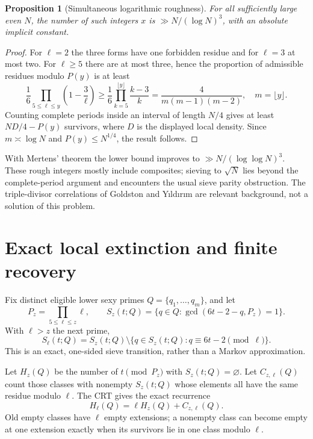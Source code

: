 \documentclass[11pt,a4paper]{article}
\newtheorem{proposition}[theorem]{Proposition}
\theoremstyle{definition}
\begin{document}
\begin{proposition}[Simultaneous logarithmic roughness]\label{prop:rough}
For all sufficiently large even $N$, the number of such integers $x$
is $\gg N/(\log N)^3$, with an absolute implicit constant.
\end{proposition}
\begin{proof}
For $\ell=2$ the three forms have one forbidden residue and for
$\ell=3$ at most two. For $\ell\ge5$ there are at most three, hence
the proportion of admissible residues modulo $P(y)$ is at least
\[
 \frac16\prod_{5\le\ell\le y}\left(1-\frac3\ell\right)
 \ge\frac16\prod_{k=5}^{\lfloor y\rfloor}\frac{k-3}{k}
 =\frac{4}{m(m-1)(m-2)},\quad m=\lfloor y\rfloor.
\]
Counting complete periods inside an interval of length $N/4$ gives
at least $ND/4-P(y)$ survivors, where $D$ is the displayed local
density. Since $m\asymp\log N$ and $P(y)\le N^{1/4}$, the result
follows.
\end{proof}

With Mertens' theorem the lower bound improves to
$\gg N/(\log\log N)^3$. These rough integers mostly include
composites; sieving to $\sqrt N$ lies beyond the complete-period
argument and encounters the usual sieve parity obstruction.
The triple-divisor correlations of Goldston and Y\i ld\i r\i m
\cite{GoldstonYildirim2007} are relevant background, not a
solution of this problem.

\section{Exact local extinction and finite recovery}

Fix distinct eligible lower sexy primes $Q=\{q_1,\ldots,q_m\}$,
and let
\begin{equation}
 P_z=\prod_{5\le\ell\le z}\ell,\qquad
 S_z(t;Q)=\{q\in Q:\gcd(6t-2-q,P_z)=1\}.
\end{equation}
With $\ell>z$ the next prime,
\begin{equation}\label{eq:transition}
 S_\ell(t;Q)=S_z(t;Q)\setminus
 \{q\in S_z(t;Q):q\equiv6t-2\pmod\ell\}.
\end{equation}
This is an exact, one-sided sieve transition, rather than a Markov
approximation.

Let $H_z(Q)$ be the number of $t\pmod{P_z}$ with
$S_z(t;Q)=\varnothing$. Let $C_{z,\ell}(Q)$ count those classes with
nonempty $S_z(t;Q)$ whose elements all have the same residue modulo
$\ell$. The CRT gives the exact recurrence
\begin{equation}\label{eq:Hrec}
 \boxed{H_\ell(Q)=\ell H_z(Q)+C_{z,\ell}(Q).}
\end{equation}
Old empty classes have $\ell$ empty extensions; a nonempty class
can become empty at one extension exactly when its survivors lie in
one class modulo $\ell$.
\end{document}
